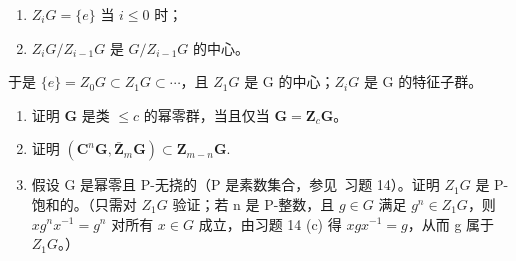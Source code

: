\begin{enumerate}
\def\labelenumi{(\roman{enumi})}
\item
  \(Z_{i}G = \{e\}\) 当 \(i \leqslant 0\) 时；
\item
  \(Z_{i}G/Z_{i-1}G\) 是 \(G/Z_{i-1}G\) 的中心。
\end{enumerate}

于是 \(\{e\} = Z_0G \subset Z_1G \subset \cdots\)，且 \(Z_1G\) 是 G 的中心；\(Z_iG\) 是 G 的特征子群。

\begin{enumerate}
\def\labelenumi{(\alph{enumi})}
\item
  证明 \(\mathbf{G}\) 是类 \(\leqslant c\) 的幂零群，当且仅当 \(\mathbf{G} = \mathbf{Z}_c\mathbf{G}\)。
\item
  证明 \((\mathbf{C}^n\mathbf{G},\bar{\mathbf{Z}}_m\mathbf{G})\subset \mathbf{Z}_{m - n}\mathbf{G}.\)
\item
  假设 G 是幂零且 P-无挠的（P 是素数集合，参见~习题 14）。证明 \(Z_{1}G\) 是 P-饱和的。（只需对 \(Z_{1}G\) 验证；若 n 是 P-整数，且 \(g \in G\) 满足 \(g^{n} \in Z_{1}G\)，则 \(xg^{n}x^{-1} = g^{n}\) 对所有 \(x \in G\) 成立，由习题 14 (c) 得 \(xgx^{-1} = g\)，从而 g 属于 \(Z_{1}G\)。）
\end{enumerate}

